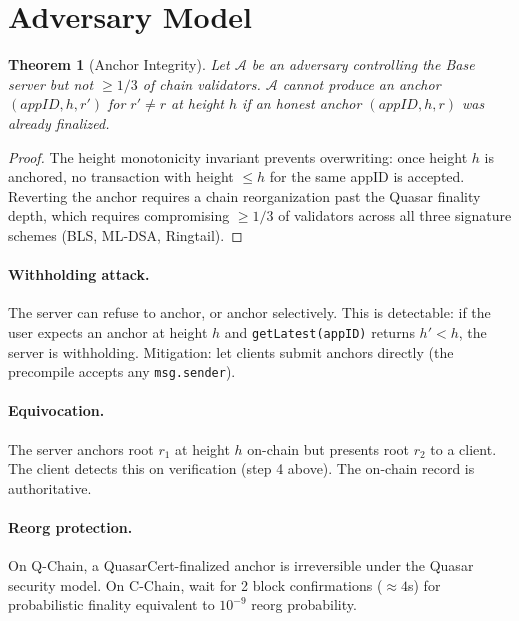 \documentclass[11pt,a4paper]{article}
\newtheorem{theorem}{Theorem}[section]
\begin{document}
\section{Adversary Model}
\label{sec:adversary}

\begin{theorem}[Anchor Integrity]
Let $\mathcal{A}$ be an adversary controlling the Base server but not
$\geq 1/3$ of chain validators. $\mathcal{A}$ cannot produce an anchor
$(appID, h, r')$ for $r' \neq r$ at height $h$ if an honest anchor
$(appID, h, r)$ was already finalized.
\end{theorem}

\begin{proof}
The height monotonicity invariant prevents overwriting: once height $h$ is
anchored, no transaction with height $\leq h$ for the same appID is
accepted. Reverting the anchor requires a chain reorganization past the
Quasar finality depth, which requires compromising $\geq 1/3$ of
validators across all three signature schemes (BLS, ML-DSA, Ringtail).
\end{proof}

\paragraph{Withholding attack.}
The server can refuse to anchor, or anchor selectively. This is detectable:
if the user expects an anchor at height $h$ and \texttt{getLatest(appID)}
returns $h' < h$, the server is withholding. Mitigation: let clients
submit anchors directly (the precompile accepts any \texttt{msg.sender}).

\paragraph{Equivocation.}
The server anchors root $r_1$ at height $h$ on-chain but presents root
$r_2$ to a client. The client detects this on verification (step 4 above).
The on-chain record is authoritative.

\paragraph{Reorg protection.}
On Q-Chain, a QuasarCert-finalized anchor is irreversible under the Quasar
security model. On C-Chain, wait for 2 block confirmations ($\approx 4$s)
for probabilistic finality equivalent to $10^{-9}$ reorg probability.

\end{document}

